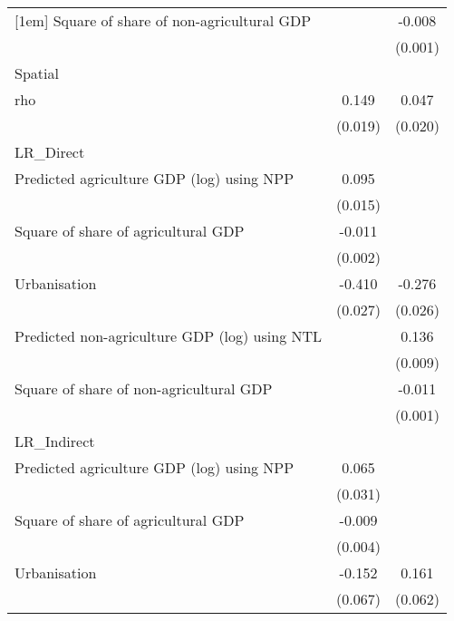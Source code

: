 {\begin{tabular}{l*{2}{c}}
[1em]
Square of share of non-agricultural GDP&                     &      -0.008\sym{***}\\
                    &                     &     (0.001)         \\
\hline
Spatial             &                     &                     \\
rho                 &       0.149\sym{***}&       0.047\sym{**} \\
                    &     (0.019)         &     (0.020)         \\
\hline
LR\_Direct           &                     &                     \\
Predicted agriculture GDP (log) using NPP&       0.095\sym{***}&                     \\
                    &     (0.015)         &                     \\
[1em]
Square of share of agricultural GDP&      -0.011\sym{***}&                     \\
                    &     (0.002)         &                     \\
[1em]
Urbanisation        &      -0.410\sym{***}&      -0.276\sym{***}\\
                    &     (0.027)         &     (0.026)         \\
[1em]
Predicted non-agriculture GDP (log) using NTL&                     &       0.136\sym{***}\\
                    &                     &     (0.009)         \\
[1em]
Square of share of non-agricultural GDP&                     &      -0.011\sym{***}\\
                    &                     &     (0.001)         \\
\hline
LR\_Indirect         &                     &                     \\
Predicted agriculture GDP (log) using NPP&       0.065\sym{**} &                     \\
                    &     (0.031)         &                     \\
[1em]
Square of share of agricultural GDP&      -0.009\sym{**} &                     \\
                    &     (0.004)         &                     \\
[1em]
Urbanisation        &      -0.152\sym{**} &       0.161\sym{***}\\
                    &     (0.067)         &     (0.062)         \\

\end{tabular}}
